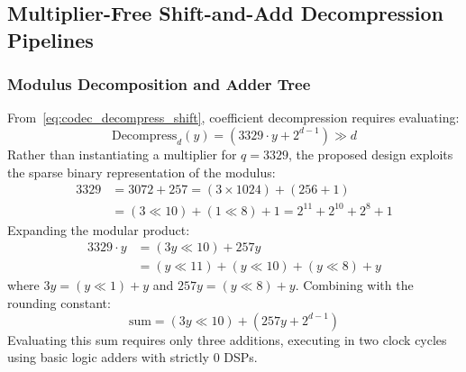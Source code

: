 \subsection{Multiplier-Free Shift-and-Add Decompression Pipelines}
\label{sec:shift_add_decompression}

\subsubsection{Modulus Decomposition and Adder Tree}
From~\eqref{eq:codec_decompress_shift}, coefficient decompression requires evaluating:
\begin{equation}
\label{eq:codec_decompress_eval}
\text{Decompress}_d(y) = \left( 3329 \cdot y + 2^{d-1} \right) \gg d
\end{equation}
Rather than instantiating a multiplier for $q = 3329$, the proposed design exploits the sparse binary representation of the modulus:
\begin{align}
\label{eq:codec_modulus_decomp}
3329 &= 3072 + 257 = (3 \times 1024) + (256 + 1) \nonumber \\
&= (3 \ll 10) + (1 \ll 8) + 1 = 2^{11} + 2^{10} + 2^8 + 1
\end{align}
Expanding the modular product:
\begin{align}
\label{eq:codec_decompress_product}
3329 \cdot y &= (3y \ll 10) + 257y \nonumber \\
&= (y \ll 11) + (y \ll 10) + (y \ll 8) + y
\end{align}
where $3y = (y \ll 1) + y$ and $257y = (y \ll 8) + y$. Combining with the rounding constant:
\begin{equation}
\label{eq:codec_decompress_full_sum}
\text{sum} = (3y \ll 10) + \left( 257y + 2^{d-1} \right)
\end{equation}
Evaluating this sum requires only three additions, executing in two clock cycles using basic logic adders with strictly 0 DSPs.

